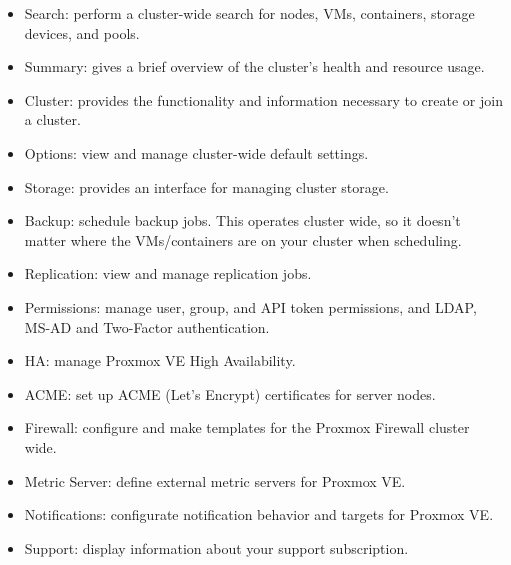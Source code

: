 \begin{itemize}[leftmargin=2cm]

	\item Search: perform a cluster-wide search for nodes, VMs, containers, storage devices, and pools.

	\item Summary: gives a brief overview of the cluster’s health and resource usage.

	\item Cluster: provides the functionality and information necessary to create or join a cluster.

	\item Options: view and manage cluster-wide default settings.

	\item Storage: provides an interface for managing cluster storage.

	\item Backup: schedule backup jobs. This operates cluster wide, so it doesn’t matter where the VMs/containers are on your cluster when scheduling.

	\item Replication: view and manage replication jobs.

	\item Permissions: manage user, group, and API token permissions, and LDAP, MS-AD and Two-Factor authentication.

	\item HA: manage Proxmox VE High Availability.

	\item ACME: set up ACME (Let’s Encrypt) certificates for server nodes.

	\item Firewall: configure and make templates for the Proxmox Firewall cluster wide.

	\item Metric Server: define external metric servers for Proxmox VE.

	\item Notifications: configurate notification behavior and targets for Proxmox VE.

	\item Support: display information about your support subscription.

\end{itemize}

